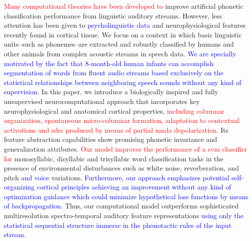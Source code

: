 \documentclass[10pt,letterpaper]{article}
\begin{document}
\textcolor{red}{Many computational theories have been developed to} improve artificial phonetic classification performance from linguistic auditory streams. However, less attention has been given to \textcolor{blue}{psycholinguistic data} and neurophysiological features recently found in cortical tissue. We focus on a context in which basic linguistic units–such as phonemes–are extracted and robustly classified by humans and other animals from complex acoustic streams in speech data. \textcolor{blue}{We are specially motivated by the fact that 8-month-old human infants can accomplish segmentation of words from fluent audio streams based exclusively on the statistical relationships between neighboring speech sounds without any kind of supervision}. In this paper, we introduce a biologically inspired and fully unsupervised neurocomputational approach that incorporates key neurophysiological and anatomical cortical properties, \textcolor{red}{including columnar organization, spontaneous micro-columnar formation, adaptation to contextual activations and \glspl{sdr} produced by means of partial \gls{nmda} depolarization}. Its feature abstraction capabilities show promising phonetic invariance and generalization attributes. \textcolor{red}{Our model improves the performance of a \gls{svm} classifier for} monosyllabic, disyllabic and trisyllabic word classification tasks in the presence of environmental disturbances such as white noise, reverberation, and pitch \textcolor{blue}{and voice} variations. \textcolor{blue}{Furthermore, our approach emphasizes potential self-organizing cortical principles achieving an improvement without any kind of optimization guidance which could minimize hypothetical loss functions by means of backpropagation}. Thus, our computational model outperforms sophisticated multiresolution spectro-temporal auditory feature representations \textcolor{blue}{using only the statistical sequential structure immerse in the phonotactic rules of the input stream}.

%


\end{document}
